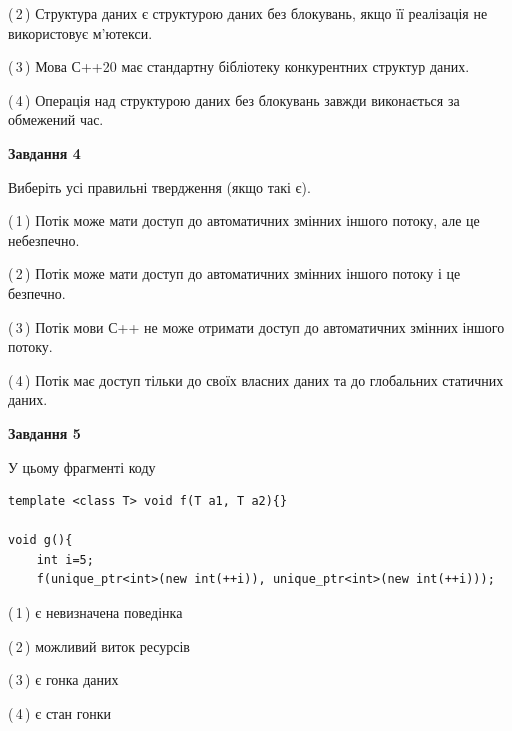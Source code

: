 \documentclass[12pt, ukrainian]{article}
\begin{document}
\begin {large}
{(\,2\,) Структура даних є структурою даних без блокувань, якщо її реалізація не використовує м’ютекси.%

(\,3\,) Мова С++20 має стандартну бібліотеку конкурентних структур даних.%

(\,4\,) Операція над структурою даних без блокувань завжди виконається за обмежений час.%



\begin{center}
\textbf{Завдання 4}
\end{center}
Виберіть усі правильні твердження (якщо такі є).\par
\vspace{2mm}

(\,1\,) Потік може мати доступ до автоматичних змінних іншого потоку, але це небезпечно.%

(\,2\,) Потік може мати доступ до автоматичних змінних іншого потоку і це безпечно.%

(\,3\,) Потік мови С++ не може отримати доступ до автоматичних змінних іншого потоку.%

(\,4\,) Потік має доступ тільки до своїх власних даних та до глобальних статичних даних.%



\begin{center}
\textbf{Завдання 5}
\end{center}
У цьому фрагменті коду
\begin{verbatim}
template <class T> void f(T a1, T a2){}

void g(){
    int i=5;
    f(unique_ptr<int>(new int(++i)), unique_ptr<int>(new int(++i)));
\end{verbatim}

(\,1\,) є невизначена поведінка%

(\,2\,) можливий виток ресурсів%

(\,3\,) є гонка даних%

(\,4\,) є стан гонки%


}
\end {large}
\end{document}
